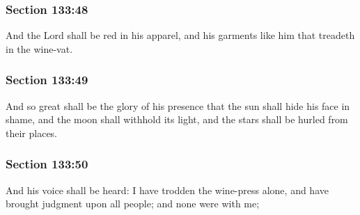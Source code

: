 	\subsubsection{Section 133:48} %
		\label{DC133-48}

		And the Lord shall be red in his apparel, and his garments like him that treadeth in the wine-vat.


	\subsubsection{Section 133:49} %
		\label{DC133-49}

		And so great shall be the glory of his presence that the sun shall hide his face in shame, and the moon shall withhold its light, and the stars shall be hurled from their places.


	\subsubsection{Section 133:50} %
		\label{DC133-50}

		And his voice shall be heard: I have trodden the wine-press alone, and have brought judgment upon all people; and none were with me;



